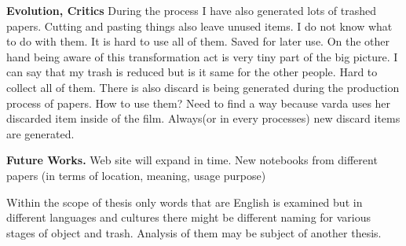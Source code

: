 %
%
\textbf{Evolution, Critics} During the process I have also generated lots of trashed papers. Cutting and pasting things also leave unused items. I do not know what to do with them. It is hard to use all of them. Saved for later use. On the other hand being aware of this transformation act is very tiny part of the big picture. I can say that my trash is reduced but is it same for the other people. Hard to collect all of them. 
There is also discard is being generated during the production process of papers. How to use them? Need to find a way because varda uses her discarded item inside of the film. Always(or in every processes) new discard items are generated.






%
%
\textbf{Future Works.} Web site will expand in time. New notebooks from different papers (in terms of location, meaning, usage purpose)

Within the scope of thesis only words that are English is examined but in different languages and cultures there might be different naming for various stages of object and trash. Analysis of them may be subject of another thesis.












